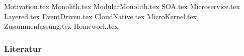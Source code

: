 \documentclass[aspectratio=\BeamerAspectRatio]{beamer}
\begin{document}
\maketitlepage %
\makesectionpopup %

{Motivation.tex}
{Monolith.tex}
{ModularMonolith.tex}
{SOA.tex}
{Microservice.tex}
{Layered.tex}
{EventDriven.tex}
{CloudNative.tex}
{MicroKernel.tex}
{Zusammenfassung.tex}
{Homework.tex}

\begin{frame}[allowframebreaks]
    \frametitle{Literatur}
    \printbibliography
\end{frame}
\end{document}
